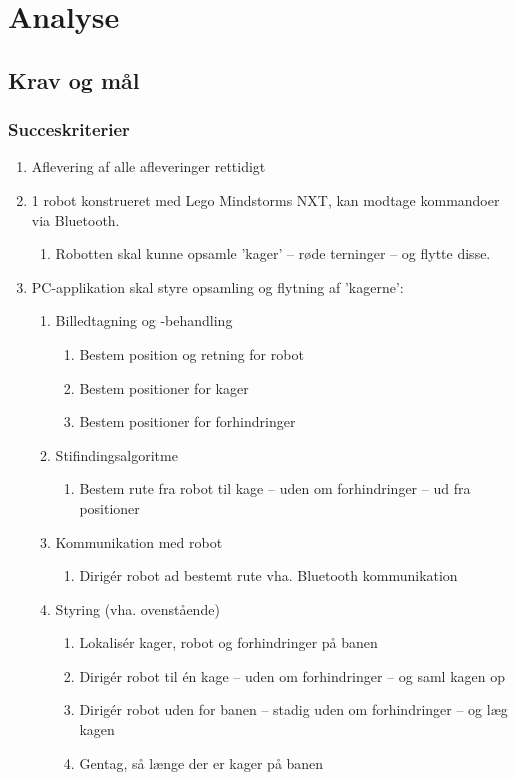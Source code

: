 \chapter{Analyse}

\section{Krav og mål}
\subsection{Succeskriterier}
\begin{enumerate}
	\item Aflevering af alle afleveringer rettidigt
	\item 1 robot konstrueret med Lego Mindstorms NXT, kan modtage kommandoer via Bluetooth.
	\begin{enumerate}
		\item Robotten skal kunne opsamle 'kager' -- røde terninger -- og flytte disse.
	\end{enumerate}
	\item PC-applikation skal styre opsamling og flytning af 'kagerne':
	\begin{enumerate}
		\item Billedtagning og -behandling
		\begin{enumerate}
			\item Bestem position og retning for robot
			\item Bestem positioner for kager
			\item Bestem positioner for forhindringer
		\end{enumerate}
		\item Stifindingsalgoritme
		\begin{enumerate}
			\item Bestem rute fra robot til kage -- uden om forhindringer -- ud fra positioner
		\end{enumerate}
		\item Kommunikation med robot
		\begin{enumerate}
			\item Dirigér robot ad bestemt rute vha. Bluetooth kommunikation
		\end{enumerate}
		\item Styring (vha. ovenstående)
		\begin{enumerate}
			\item Lokalisér kager, robot og forhindringer på banen
			\item Dirigér robot til én kage -- uden om forhindringer -- og saml kagen op
			\item Dirigér robot uden for banen -- stadig uden om forhindringer -- og læg kagen
			\item Gentag, så længe der er kager på banen
		\end{enumerate}
	\end{enumerate}
\end{enumerate}

